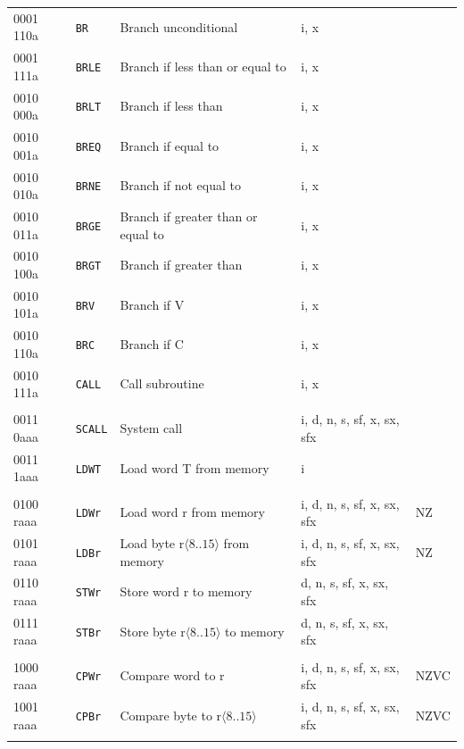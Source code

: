 \documentclass[10pt,fleqn]{book}
\begin{document}
\begin{tabular}{ l l l l l }
0001 110a   & \verb|BR|      & Branch unconditional                        & i, x \\
0001 111a   & \verb|BRLE|    & Branch if less than or equal to             & i, x \\ 
0010 000a   & \verb|BRLT|    & Branch if less than                         & i, x \\
0010 001a   & \verb|BREQ|    & Branch if equal to                          & i, x \\ 
0010 010a   & \verb|BRNE|    & Branch if not equal to                      & i, x \\ 
0010 011a   & \verb|BRGE|    & Branch if greater than or equal to          & i, x \\ 
0010 100a   & \verb|BRGT|    & Branch if greater than                      & i, x \\ 
0010 101a   & \verb|BRV|     & Branch if V                                 & i, x \\ 
0010 110a   & \verb|BRC|     & Branch if C                                 & i, x \\ 
0010 111a   & \verb|CALL|    & Call subroutine                             & i, x \\ 
 \\
0011 0aaa   & \verb|SCALL|   & System call                                 & i, d, n, s, sf, x, sx, sfx \\
0011 1aaa   & \verb|LDWT|    & Load word T from memory                     & i \\
 \\
0100 raaa   & \verb|LDWr|    & Load word r from memory                     & i, d, n, s, sf, x, sx, sfx  & NZ \\
0101 raaa   & \verb|LDBr|    & Load byte r$\langle8..15\rangle$ from memory& i, d, n, s, sf, x, sx, sfx  & NZ \\
0110 raaa   & \verb|STWr|    & Store word r to memory                      & d, n, s, sf, x, sx, sfx \\
0111 raaa   & \verb|STBr|    & Store byte r$\langle8..15\rangle$ to memory & d, n, s, sf, x, sx, sfx \\
\\
1000 raaa   & \verb|CPWr|    & Compare word to r                           & i, d, n, s, sf, x, sx, sfx  & NZVC \\
1001 raaa   & \verb|CPBr|    & Compare byte to r$\langle8..15\rangle$      & i, d, n, s, sf, x, sx, sfx  & NZVC \\
 \\

\end{tabular}
\end{document}
